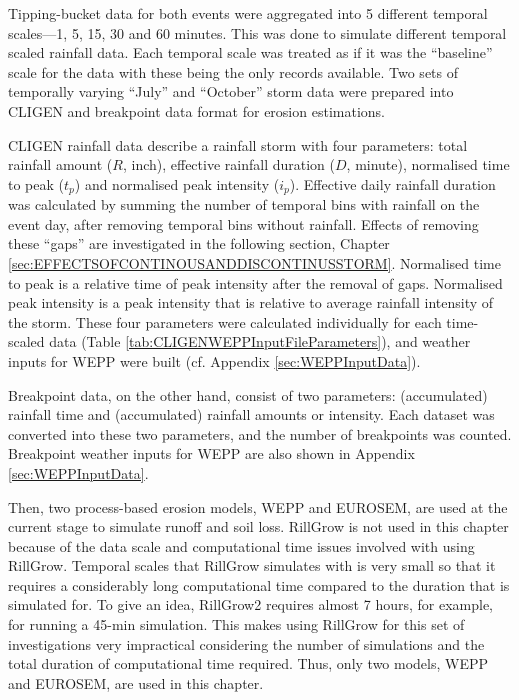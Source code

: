 Tipping-bucket data for both events were aggregated into 5 different temporal
scales---1, 5, 15, 30 and 60 minutes. This was done to simulate different
temporal scaled rainfall data. Each temporal scale was treated as if it was the
``baseline'' scale for the data with these being the only records available. Two
sets of temporally varying ``July'' and ``October'' storm data were prepared
into CLIGEN and breakpoint data format for erosion estimations.

CLIGEN rainfall data describe a rainfall storm with four parameters: total
rainfall amount ($R$, inch), effective rainfall duration ($D$, minute),
normalised time to peak ($t_p$) and normalised peak intensity ($i_p$). Effective
daily rainfall duration was calculated by summing the number of temporal bins
with rainfall on the event day, after removing temporal bins without rainfall.
Effects of removing these ``gaps'' are investigated in the following section,
Chapter \ref{sec:EFFECTSOFCONTINOUSANDDISCONTINUSSTORM}. Normalised time to
peak is a relative time of peak intensity after the removal of gaps.
Normalised peak intensity is a peak intensity that is relative to average
rainfall intensity of the storm. These four parameters were calculated
individually for each time-scaled data (Table
\ref{tab:CLIGENWEPPInputFileParameters}), and weather inputs for WEPP were
built (cf. Appendix \ref{sec:WEPPInputData}).

Breakpoint data, on the other hand, consist of two parameters: (accumulated)
rainfall time and (accumulated) rainfall amounts or intensity. Each dataset was
converted into these two parameters, and the number of breakpoints was counted.
Breakpoint weather inputs for WEPP are also shown in Appendix
\ref{sec:WEPPInputData}.

Then, two process-based erosion models, WEPP and EUROSEM, are used at the
current stage to simulate runoff and soil loss. RillGrow is not used in
this chapter because of the data scale and computational time issues involved
with using RillGrow. Temporal scales that RillGrow simulates with is very small
so that it requires a considerably long computational time compared to the
duration that is simulated for. To give an idea, RillGrow2 requires almost 7
hours, for example, for running a 45-min simulation. This makes using RillGrow
for this set of investigations very impractical considering the number of
simulations and the total duration of computational time required. Thus, only
two models, WEPP and EUROSEM, are used in this chapter.

